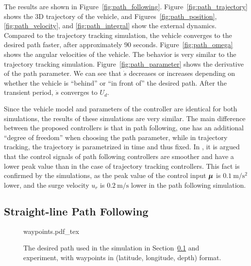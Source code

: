 The results are shown in Figure~\ref{fig:path_following}.
Figure~\ref{fig:path_trajectory} shows the 3D trajectory of the vehicle, and Figures~\ref{fig:path_position}, \ref{fig:path_velocity}, and \ref{fig:path_integral} show the external dynamics.
Compared to the trajectory tracking simulation, the vehicle converges to the desired path faster, after approximately $90$ seconds.
Figure~\ref{fig:path_omega} shows the angular velocities of the vehicle.
The behavior is very similar to the trajectory tracking simulation.
Figure~\ref{fig:path_parameter} shows the derivative of the path parameter.
We can see that $\dot{s}$ decreases or increases depending on whether the vehicle is ``behind'' or ``in front of'' the desired path.
After the transient period, $\dot{s}$ converges to $U_d$.

Since the vehicle model and parameters of the controller are identical for both simulations, the results of these simulations are very similar.
The main difference between the proposed controllers is that in path following, one has an additional ``degree of freedom'' when choosing the path parameter, while in trajectory tracking, the trajectory is parametrized in time and thus fixed.
In \cite{aguiar_trajectory_tracking_2007}, it is argued that the control signals of path following controllers are smoother and have a lower peak value than in the case of trajectory tracking controllers.
This fact is confirmed by the simulations, as the peak value of the control input $\bm{\mu}$ is $\SI{0.1}{\meter\per\second\squared}$ lower, and the surge velocity $u_r$ is $\SI{0.2}{\meter\per\second}$ lower in the path following simulation.

\subsection{Straight-line Path Following}
\label{sec:handpos_trajectory_simulation_waypoints}

\begin{figure}[tb]
    \centering
    \def\svgwidth{0.7\textwidth}
    
    {waypoints.pdf_tex}
    \vspace*{-0.5mm}
    \caption{The desired path used in the simulation in Section~\ref{sec:handpos_trajectory_simulation_waypoints} and experiment, with waypoints in (latitude, longitude, depth) format.}
    \label{fig:waypoints}
\end{figure}



